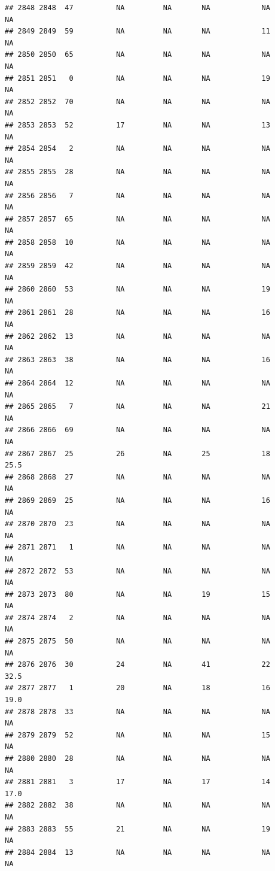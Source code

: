 \documentclass[man]{apa6}
\begin{document}
\begin{verbatim}
## 2848 2848  47          NA         NA       NA            NA       NA
## 2849 2849  59          NA         NA       NA            11       NA
## 2850 2850  65          NA         NA       NA            NA       NA
## 2851 2851   0          NA         NA       NA            19       NA
## 2852 2852  70          NA         NA       NA            NA       NA
## 2853 2853  52          17         NA       NA            13       NA
## 2854 2854   2          NA         NA       NA            NA       NA
## 2855 2855  28          NA         NA       NA            NA       NA
## 2856 2856   7          NA         NA       NA            NA       NA
## 2857 2857  65          NA         NA       NA            NA       NA
## 2858 2858  10          NA         NA       NA            NA       NA
## 2859 2859  42          NA         NA       NA            NA       NA
## 2860 2860  53          NA         NA       NA            19       NA
## 2861 2861  28          NA         NA       NA            16       NA
## 2862 2862  13          NA         NA       NA            NA       NA
## 2863 2863  38          NA         NA       NA            16       NA
## 2864 2864  12          NA         NA       NA            NA       NA
## 2865 2865   7          NA         NA       NA            21       NA
## 2866 2866  69          NA         NA       NA            NA       NA
## 2867 2867  25          26         NA       25            18     25.5
## 2868 2868  27          NA         NA       NA            NA       NA
## 2869 2869  25          NA         NA       NA            16       NA
## 2870 2870  23          NA         NA       NA            NA       NA
## 2871 2871   1          NA         NA       NA            NA       NA
## 2872 2872  53          NA         NA       NA            NA       NA
## 2873 2873  80          NA         NA       19            15       NA
## 2874 2874   2          NA         NA       NA            NA       NA
## 2875 2875  50          NA         NA       NA            NA       NA
## 2876 2876  30          24         NA       41            22     32.5
## 2877 2877   1          20         NA       18            16     19.0
## 2878 2878  33          NA         NA       NA            NA       NA
## 2879 2879  52          NA         NA       NA            15       NA
## 2880 2880  28          NA         NA       NA            NA       NA
## 2881 2881   3          17         NA       17            14     17.0
## 2882 2882  38          NA         NA       NA            NA       NA
## 2883 2883  55          21         NA       NA            19       NA
## 2884 2884  13          NA         NA       NA            NA       NA

\end{verbatim}
\end{document}
